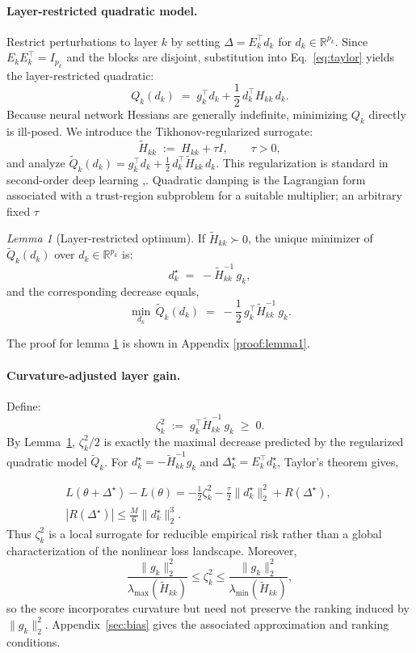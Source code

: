 \documentclass[accepted]{uai2026}%
\theoremstyle{remark}%
\newtheorem{lemma}[theorem]{Lemma}
\begin{document}
\paragraph{Layer-restricted quadratic model.}
Restrict perturbations to layer $k$ by setting
$\Delta = E_k^{\top} d_k$ for $d_k \in \mathbb{R}^{p_k}$.
Since $E_k E_k^{\top} = I_{p_k}$ and the blocks are disjoint,
substitution into Eq.~\eqref{eq:taylor} yields the layer-restricted quadratic:
\[
  Q_k(d_k)
  \;=\;
  g_k^{\top} d_k
  + \frac{1}{2}\,d_k^{\top} H_{kk}\, d_k.
\]
Because neural network Hessians are generally indefinite,
minimizing $Q_k$ directly is ill-posed.
We introduce the Tikhonov-regularized surrogate:
\begin{equation}
  \label{eq:surrogate}
  \widetilde{H}_{kk} \;:=\; H_{kk} + \tau I,
  \qquad \tau > 0,
\end{equation}
and analyze
$\widetilde{Q}_k(d_k) = g_k^{\top} d_k + \tfrac{1}{2}\,d_k^{\top}\widetilde{H}_{kk}\,d_k$.
This regularization is standard in second-order deep learning
\citep{martens2015optimizing},\citet{botev2017practical}.
Quadratic damping is the Lagrangian form associated with a
trust-region subproblem for a suitable multiplier; an arbitrary fixed $\tau$
\begin{lemma}[Layer-restricted optimum]
\label{lem:layeropt}
  If $\widetilde{H}_{kk} \succ 0$, the unique minimizer of $\widetilde{Q}_k(d_k)$
  over $d_k \in \mathbb{R}^{p_k}$ is:
  \[
    d_k^{\star} \;=\; -\widetilde{H}_{kk}^{-1}\,g_k,
  \]
  and the corresponding decrease equals,
  \[    \min_{d_k}\,\widetilde{Q}_k(d_k)
    \;=\;
    -\frac{1}{2}\,g_k^{\top}\widetilde{H}_{kk}^{-1}\,g_k.\]
\end{lemma}
The proof for lemma \ref{lem:layeropt} is shown in Appendix \ref{proof:lemma1}.

\paragraph{Curvature-adjusted layer gain.}
Define:%
\begin{equation}
  \label{eq:gain}
  \zeta_k^{2} \;:=\; g_k^{\top}\widetilde{H}_{kk}^{-1}\,g_k \;\ge\; 0.
\end{equation}
By Lemma~\ref{lem:layeropt}, $\zeta_k^2/2$ is exactly the
maximal decrease predicted by the regularized quadratic model $\widetilde Q_k$.
For $d_k^\star=-\widetilde H_{kk}^{-1}g_k$ and
$\Delta_k^\star=E_k^\top d_k^\star$, Taylor's theorem gives,

\begin{multline*}
L(\theta+\Delta^\star)-L(\theta)
= -\frac12\zeta_k^2-\frac{\tau}{2}\|d_k^\star\|_2^2+R(\Delta^\star),
\qquad\\
|R(\Delta^\star)|\le \frac{M}{6}\|d_k^\star\|_2^3.
\end{multline*}
Thus $\zeta_k^2$ is a local surrogate for reducible empirical risk rather
than a global characterization of the nonlinear loss landscape. Moreover,
\[
\frac{\|g_k\|_2^2}{\lambda_{\max}(\widetilde H_{kk})}
\le \zeta_k^2
\le
\frac{\|g_k\|_2^2}{\lambda_{\min}(\widetilde H_{kk})},
\]
so the score incorporates curvature but need not preserve the ranking induced
by $\|g_k\|_2^2$. Appendix~\ref{sec:bias} gives the associated approximation
and ranking conditions.
\end{document}
